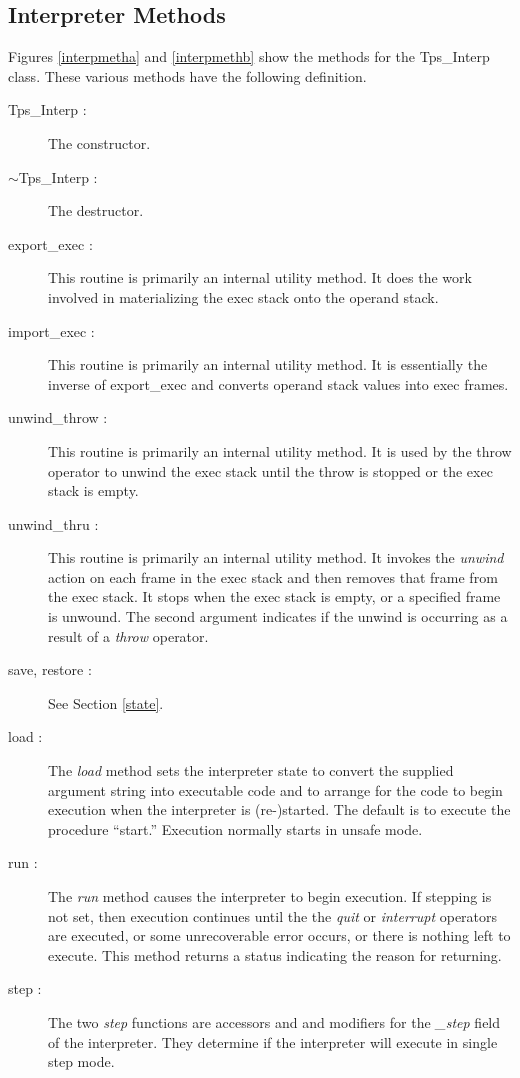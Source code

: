 \subsection{Interpreter Methods}
Figures \ref{interpmetha}
and \ref{interpmethb} show the methods for the Tps\_Interp class.
These various methods have the following definition.
\begin{description}
\item[Tps\_Interp :] The constructor.
\item[$\sim$Tps\_Interp :] The destructor.
\item[export\_exec :]
This routine is primarily an internal utility method.
It does the work involved in materializing the exec stack
onto the operand stack.
\item[import\_exec :]
This routine is primarily an internal utility method.
It is essentially the inverse of export\_exec
and converts operand stack values into exec frames.
\item[unwind\_throw :]
This routine is primarily an internal utility method.
It is used by the throw operator to unwind the exec
stack until the throw is stopped or the exec stack is empty.
\item[unwind\_thru :]
This routine is primarily an internal utility method.
It invokes the {\em unwind} action on each frame in the exec stack
and then removes that frame from the exec stack.
It stops when the exec stack is empty, or a specified frame
is unwound.  The second argument indicates if the unwind
is occurring as a result of a {\em throw} operator.
\item[save, restore :]
See Section \ref{state}.
\item[load :]
The {\em load} method sets the interpreter state to convert
the supplied argument string into executable code and to arrange
for the code to begin execution when the interpreter
is (re-)started.
The default is to execute the procedure ``start.''
Execution normally starts in unsafe mode.
\item[run :]
The {\em run} method causes the interpreter to begin execution.
If stepping is not set, then execution continues until the
the {\em quit} or {\em interrupt} operators are executed,
or some unrecoverable error occurs, or there is nothing left to execute.
This method returns a status indicating the reason for returning. 
\item[step :]
The two {\em step} functions are accessors and 
and modifiers for the {\em \_step} field of the interpreter.
They determine if the interpreter will execute in single step mode.

\end{description}
